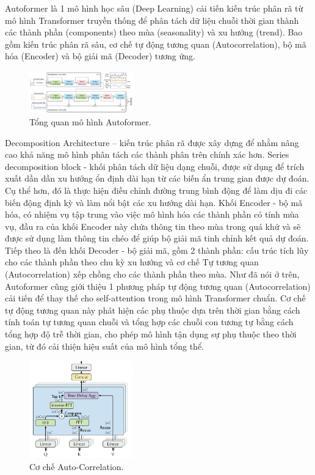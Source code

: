 Autoformer là 1 mô hình học sâu (Deep Learning) cải tiến kiến trúc phân rã từ mô hình Transformer truyền thống để phân tách dữ liệu chuỗi thời gian thành các thành phần (components) theo mùa (seasonality) và xu hướng (trend). Bao gồm kiến trúc phân rã sâu, cơ chế tự động tương quan (Autocorrelation), bộ mã hóa (Encoder) và bộ giải mã (Decoder) tương ứng.

\begin{figure}[htbp]
\centerline{\includegraphics[width=0.4\textwidth]{img/autoformer.jpg}}
\caption{Tổng quan mô hình Autoformer.}
\label{fig}
\end{figure}

Decomposition Architecture – kiến trúc phân rã được xây dựng để nhằm nâng cao khả năng mô hình phân tách các thành phân trên chính xác hơn. Series decomposition block - khối phân tách dữ liệu dạng chuỗi, được sử dụng để trích xuất dần dần xu hướng ổn định dài hạn từ các biến ẩn trung gian được dự đoán. Cụ thể hơn, đó là thực hiện điều chỉnh đường trung bình động để làm dịu đi các biến động định kỳ và làm nổi bật các xu hướng dài hạn. Khối Encoder - bộ mã hóa, có nhiệm vụ tập trung vào việc mô hình hóa các thành phần có tính mùa vụ, đầu
ra của khối Encoder này chứa thông tin theo mùa trong quá khứ và sẽ được sử dụng làm thông tin chéo để giúp bộ giải mã tinh chỉnh kết quả dự đoán. Tiếp theo là đến khối Decoder - bộ giải mã, gồm 2 thành phần: cấu trúc tích lũy cho các thành phần theo chu kỳ xu hướng và cơ chế Tự tương quan (Autocorrelation) xếp chồng cho các thành phần theo mùa. \newline Như đã nói ở trên, Autoformer cũng giới thiệu 1 phương pháp tự động tương quan (Autocorrelation) cải tiến để thay thế cho self-attention trong mô hình Transformer chuẩn. Cơ chế tự động tương quan này phát hiện các phụ thuộc dựa trên thời gian bằng cách tính toán tự tương quan chuỗi và tổng hợp các chuỗi con tương tự bằng cách tổng hợp độ trễ thời gian, cho phép mô hình tận dụng sự phụ thuộc theo thời gian, từ đó cải thiện hiệu suất của mô hình tổng thể.

\begin{figure}[htbp]
\centerline{\includegraphics[width=0.4\textwidth]{img/autocorrelation.png}}
\caption{Cơ chế Auto-Correlation.}
\label{fig}
\end{figure}